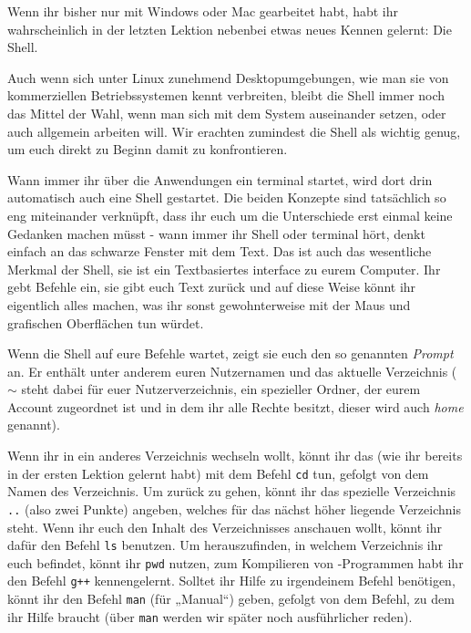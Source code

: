 
Wenn ihr bisher nur mit Windows oder Mac gearbeitet habt, habt ihr
wahrscheinlich in der letzten Lektion nebenbei etwas neues Kennen gelernt: Die
Shell.

Auch wenn sich unter Linux zunehmend Desktopumgebungen, wie man sie von
kommerziellen Betriebssystemen kennt verbreiten, bleibt die Shell immer noch das
Mittel der Wahl, wenn man sich mit dem System auseinander setzen, oder auch
allgemein arbeiten will. Wir erachten zumindest die Shell als wichtig genug, um
euch direkt zu Beginn damit zu konfrontieren.

Wann immer ihr über die Anwendungen ein \Gls{terminal} startet, wird dort drin
automatisch auch eine Shell gestartet. Die beiden Konzepte sind tatsächlich so
eng miteinander verknüpft, dass ihr euch um die Unterschiede erst einmal keine
Gedanken machen müsst - wann immer ihr Shell oder \Gls{terminal} hört, denkt einfach
an das schwarze Fenster mit dem Text. Das ist auch das wesentliche Merkmal der
Shell, sie ist ein Textbasiertes interface zu eurem Computer. Ihr gebt Befehle
ein, sie gibt euch Text zurück und auf diese Weise könnt ihr eigentlich alles
machen, was ihr sonst gewohnterweise mit der Maus und grafischen Oberflächen
tun würdet.

Wenn die Shell auf eure Befehle wartet, zeigt sie euch den so genannten
\emph{Prompt} an. Er enthält unter anderem euren Nutzernamen und das aktuelle
Verzeichnis ($\sim$ steht dabei für euer Nutzerverzeichnis, ein spezieller
Ordner, der eurem Account zugeordnet ist und in dem ihr alle Rechte besitzt,
dieser wird auch \emph{home} genannt).

Wenn ihr in ein anderes Verzeichnis wechseln wollt, könnt ihr das (wie ihr
bereits in der ersten Lektion gelernt habt) mit dem Befehl \texttt{cd} tun,
gefolgt von dem Namen des Verzeichnis. Um zurück zu gehen, könnt ihr das
spezielle Verzeichnis \texttt{..} (also zwei Punkte) angeben, welches für das
nächst höher liegende Verzeichnis steht. Wenn ihr euch den Inhalt des
Verzeichnisses anschauen wollt, könnt ihr dafür den Befehl \texttt{ls}
benutzen. Um herauszufinden, in welchem Verzeichnis ihr euch befindet, könnt
ihr \texttt{pwd} nutzen, zum Kompilieren von \Cpp-Programmen habt ihr den Befehl
\texttt{g++} kennengelernt. Solltet ihr Hilfe zu irgendeinem Befehl benötigen,
könnt ihr den Befehl \texttt{man} (für „Manual“) geben, gefolgt von dem Befehl,
zu dem ihr Hilfe braucht (über \texttt{man} werden wir später noch
ausführlicher reden).

